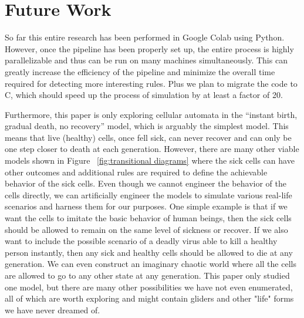 \documentclass[12pt]{article}
\numberwithin{figure}{section} %
\begin{document}
\newpage
\section{Future Work}
\label{Future Work}
So far this entire research has been performed in Google Colab using Python. However, once the pipeline has been properly set up, the entire process is highly parallelizable and thus can be run on many machines simultaneously. This can greatly increase the efficiency of the pipeline and minimize the overall time required for detecting more interesting rules. Plus we plan to migrate the code to C, which should speed up the process of simulation by at least a factor of 20. 

Furthermore, this paper is only exploring cellular automata in the “instant birth, gradual death, no recovery” model, which is arguably the simplest model. This means that live (healthy) cells, once fell sick, can never recover and can only be one step closer to death at each generation. However, there are many other viable models shown in Figure ~\ref{fig:transitional diagrams} where the sick cells can have other outcomes and additional rules are required to define the achievable behavior of the sick cells. Even though we cannot engineer the behavior of the cells directly, we can artificially engineer the models to simulate various real-life scenarios and harness them for our purposes. One simple example is that if we want the cells to imitate the basic behavior of human beings, then the sick cells should be allowed to remain on the same level of sickness or recover. If we also want to include the possible scenario of a deadly virus able to kill a healthy person instantly, then any sick and healthy cells should be allowed to die at any generation. We can even construct an imaginary chaotic world where all the cells are allowed to go to any other state at any generation. This paper only studied one model, but there are many other possibilities we have not even enumerated, all of which are worth exploring and might contain gliders and other "life" forms we have never dreamed of. 
\end{document}
